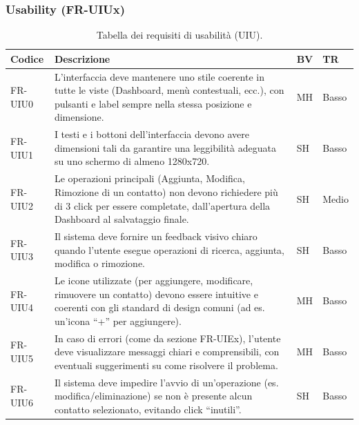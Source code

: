 \documentclass[a4paper,12pt]{article}
\begin{document}
    \subsubsection{Usability (FR-UIUx)}
    \begin{table}[H]
        \centering
        \begin{tabular}{|l|p{8cm}|l|l|}
            \hline
            \textbf{Codice} & \textbf{Descrizione} & \textbf{BV} & \textbf{TR} \\
            \hline
            FR-UIU0 &
            L'interfaccia deve mantenere uno stile coerente in tutte le viste (Dashboard, menù contestuali, ecc.),
            con pulsanti e label sempre nella stessa posizione e dimensione.
            & MH & Basso \\
            \hline
            FR-UIU1 &
            I testi e i bottoni dell'interfaccia devono avere dimensioni tali
            da garantire una leggibilità adeguata su uno schermo di almeno 1280x720.
            & SH & Basso \\
            \hline
            FR-UIU2 &
            Le operazioni principali (Aggiunta, Modifica, Rimozione di un contatto)
            non devono richiedere più di 3 click per essere completate, dall'apertura della Dashboard al salvataggio finale.
            & SH & Medio \\
            \hline
            FR-UIU3 &
            Il sistema deve fornire un feedback visivo chiaro quando l'utente esegue operazioni di ricerca, aggiunta, modifica o rimozione.
            & SH & Basso \\
            \hline
            FR-UIU4 &
            Le icone utilizzate (per aggiungere, modificare, rimuovere un contatto)
            devono essere intuitive e coerenti con gli standard di design comuni (ad es. un'icona “+” per aggiungere).
            & MH & Basso \\
            \hline
            FR-UIU5 &
            In caso di errori (come da sezione FR-UIEx), l'utente deve visualizzare messaggi chiari e comprensibili,
            con eventuali suggerimenti su come risolvere il problema.
            & MH & Basso \\
            \hline
            FR-UIU6 &
            Il sistema deve impedire l’avvio di un’operazione (es. modifica/eliminazione)
            se non è presente alcun contatto selezionato, evitando click “inutili”.
            & SH & Basso \\
            \hline
        \end{tabular}
        \caption{Tabella dei requisiti di usabilità (UIU).}
    \end{table}
\end{document}
